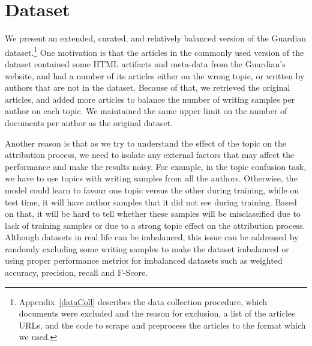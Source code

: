 \documentclass[11pt]{article}
\begin{document}
\section{Dataset\label{subsec:dataset}}
We present an extended, curated, and relatively balanced version of the Guardian dataset.\footnote{Appendix~\ref{dataColl} describes the data collection procedure, which documents were excluded and the reason for exclusion, a list of the articles URLs, and the code to scrape and preprocess the articles to the format which we used.} 
One motivation is that the articles in the commonly used version of the dataset contained some HTML artifacts and meta-data from the Guardian's website, and had a number of its articles either on the wrong topic, or written by authors that are not in the dataset. Because of that, we retrieved the original articles, and added more articles to balance the number of writing samples per author on each topic. We maintained the same upper limit on the number of documents per author as the original dataset.

Another reason is that as we try to understand the effect of the topic on the attribution process, we need to isolate any external factors that may affect the performance and make the results noisy. For example, in the topic confusion task, we have to use topics with writing samples from all the authors. Otherwise, the model could learn to favour one topic versus the other during training, while on test time, it will have author samples that it did not see during training. Based on that, it will be hard to tell whether these samples will be misclassified due to lack of training samples or due to a strong topic effect on the attribution process. Although datasets in real life can be imbalanced, this issue can be addressed by randomly excluding some writing samples to make the dataset imbalanced or using proper performance metrics for imbalanced datasets such as weighted accuracy, precision, recall and F-Score. 

\end{document}
